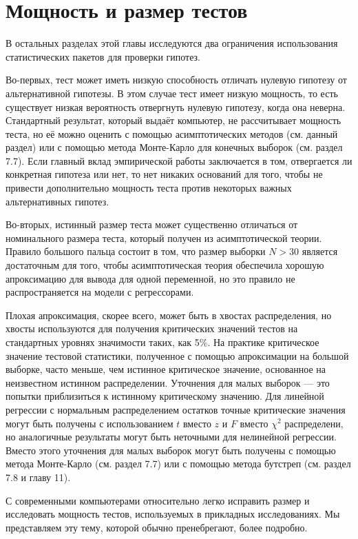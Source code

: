\section{Мощность и размер тестов}

В остальных разделах этой главы исследуются два ограничения использования статистических пакетов для проверки гипотез.

Во-первых, тест может иметь низкую способность отличать нулевую гипотезу от альтернативной гипотезы. В этом случае тест имеет низкую мощность, то есть существует низкая вероятность отвергнуть нулевую гипотезу, когда она неверна. Стандартный результат, который выдаёт компьютер, не рассчитывает мощность теста, но её можно оценить с помощью асимптотических методов (см. данный раздел) или с помощью метода Монте-Карло для конечных выборок (см. раздел 7.7). Если главный вклад эмпирической работы заключается в том, отвергается ли конкретная гипотеза или нет, то нет никаких оснований для того, чтобы не привести дополнительно мощность теста против некоторых важных альтернативных гипотез.

Во-вторых, истинный размер теста может существенно отличаться от номинального размера теста, который получен из асимптотической теории. Правило большого пальца состоит в том, что размер выборки $N > 30$ является достаточным для того, чтобы асимптотическая теория обеспечила хорошую апроксимацию для вывода для одной переменной, но это правило не распространяется на модели с регрессорами. 

Плохая апроксимация, скорее всего, может быть в хвостах распределения, но хвосты используются для получения критических значений тестов на стандартных уровнях значимости таких, как 5\%. На практике критическое значение тестовой статистики, полученное с помощью апроксимации на большой выборке, часто меньше, чем истинное критическое значение, основанное на неизвестном истинном распределении. Уточнения для малых выборок --- это попытки приблизиться к истинному критическому значению. Для линейной регрессии с нормальным распределением остатков точные критические значения могут быть получены с использованием $t$ вместо $z$ и $F$ вместо $\chi^2$ распределени, но аналогичные результаты могут быть неточными для нелинейной регрессии. Вместо этого уточнения для малых выборок могут быть получены с помощью метода Монте-Карло (см. раздел 7.7) или с помощью метода бутстреп (см. раздел 7.8 и главу 11).

С современными компьютерами относительно легко исправить размер и исследовать мощность тестов, используемых в прикладных исследованиях. Мы представляем эту тему, которой обычно пренебрегают, более подробно.


